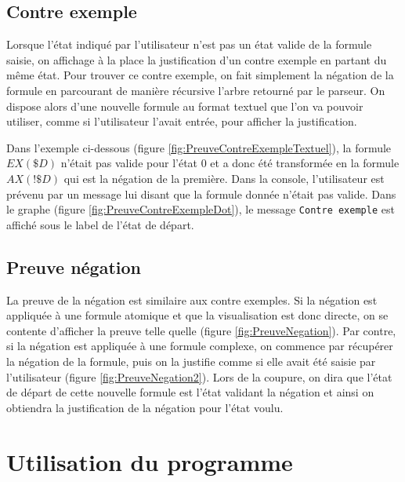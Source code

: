 \documentclass[dvipsnames]{report}
\begin{document}


\subsection{Contre exemple}

Lorsque l'état indiqué par l'utilisateur n'est pas un état valide de la formule saisie, on affichage à la place la justification d'un contre exemple en partant du même état. Pour trouver ce contre exemple, on fait simplement la négation de la formule en parcourant de manière récursive l'arbre retourné par le parseur. On dispose alors d'une nouvelle formule au format textuel que l'on va pouvoir utiliser, comme si l'utilisateur l'avait entrée, pour afficher la justification.

Dans l'exemple ci-dessous (figure \ref{fig:PreuveContreExempleTextuel}), la formule $EX(\$D)$ n'était pas valide pour l'état 0 et a donc été transformée en la formule $AX(!\$D)$ qui est la négation de la première. Dans la console, l'utilisateur est prévenu par un message lui disant que la formule donnée n'était pas valide. Dans le graphe (figure \ref{fig:PreuveContreExempleDot}), le message \texttt{Contre exemple} est affiché sous le label de l'état de départ.



\subsection{Preuve négation}

La preuve de la négation est similaire aux contre exemples. Si la négation est appliquée à une formule atomique et que la visualisation est donc directe, on se contente d'afficher la preuve telle quelle (figure \ref{fig:PreuveNegation}). Par contre, si la négation est appliquée à une formule complexe, on commence par récupérer la négation de la formule, puis on la justifie comme si elle avait été saisie par l'utilisateur (figure \ref{fig:PreuveNegation2}). Lors de la coupure, on dira que l'état de départ de cette nouvelle formule est l'état validant la négation et ainsi on obtiendra la justification de la négation pour l'état voulu.





\section{Utilisation du programme}
\end{document}
